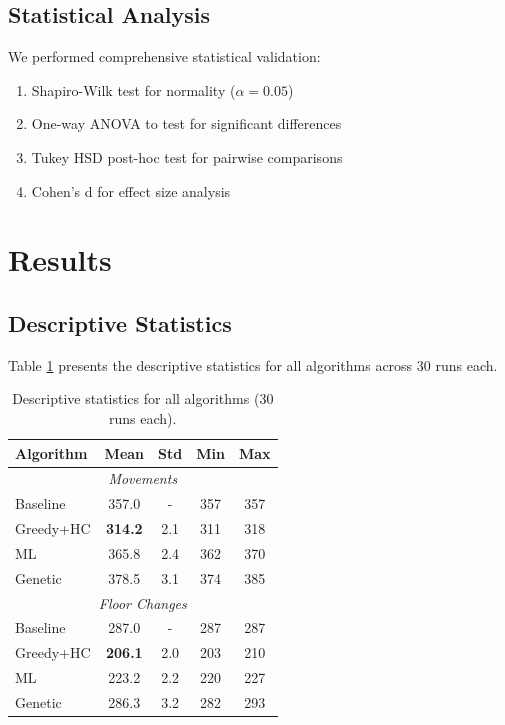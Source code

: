 \documentclass[12pt,a4paper]{article}
\begin{document}
\subsection{Statistical Analysis}

We performed comprehensive statistical validation:
\begin{enumerate}
\item Shapiro-Wilk test for normality ($\alpha = 0.05$)
\item One-way ANOVA to test for significant differences
\item Tukey HSD post-hoc test for pairwise comparisons
\item Cohen's d for effect size analysis
\end{enumerate}

\section{Results}

\subsection{Descriptive Statistics}

Table \ref{tab:results} presents the descriptive statistics for all algorithms across 30 runs each.

\begin{table}[h]
\centering
\caption{Descriptive statistics for all algorithms (30 runs each).}
\label{tab:results}
\begin{tabular}{lcccc}
\toprule
\textbf{Algorithm} & \textbf{Mean} & \textbf{Std} & \textbf{Min} & \textbf{Max} \\
\midrule
\multicolumn{5}{c}{\textit{Movements}} \\
\midrule
Baseline & 357.0 & - & 357 & 357 \\
Greedy+HC & \textbf{314.2} & 2.1 & 311 & 318 \\
ML & 365.8 & 2.4 & 362 & 370 \\
Genetic & 378.5 & 3.1 & 374 & 385 \\
\midrule
\multicolumn{5}{c}{\textit{Floor Changes}} \\
\midrule
Baseline & 287.0 & - & 287 & 287 \\
Greedy+HC & \textbf{206.1} & 2.0 & 203 & 210 \\
ML & 223.2 & 2.2 & 220 & 227 \\
Genetic & 286.3 & 3.2 & 282 & 293 \\
\bottomrule
\end{tabular}
\end{table}
\end{document}
